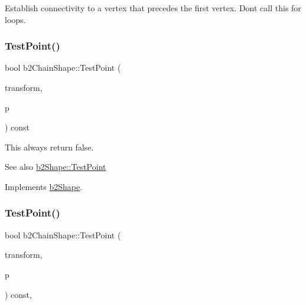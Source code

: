Establish connectivity to a vertex that precedes the first vertex. Don\textquotesingle{}t call this for loops. \mbox{\label{classb2ChainShape_a2d2d59b49c2611ad65ed68b0943d642d}} 
\subsubsection{\texorpdfstring{Test\+Point()}{TestPoint()}\hspace{0.1cm}{\footnotesize\ttfamily [1/2]}}
{\footnotesize\ttfamily bool b2\+Chain\+Shape\+::\+Test\+Point (\begin{DoxyParamCaption}\item[{const \hyperlink{structb2Transform}{b2\+Transform} \&}]{transform,  }\item[{const \hyperlink{structb2Vec2}{b2\+Vec2} \&}]{p }\end{DoxyParamCaption}) const\hspace{0.3cm}{\ttfamily [virtual]}}

This always return false. \begin{DoxySeeAlso}{See also}
\hyperlink{classb2Shape_a6ac968e403e2d93e8ae46d728a2e50fa}{b2\+Shape\+::\+Test\+Point} 
\end{DoxySeeAlso}


Implements \hyperlink{classb2Shape_a6ac968e403e2d93e8ae46d728a2e50fa}{b2\+Shape}.

\mbox{\label{classb2ChainShape_afd03c8679f18f9962a6c76bde629c62a}} 
\subsubsection{\texorpdfstring{Test\+Point()}{TestPoint()}\hspace{0.1cm}{\footnotesize\ttfamily [2/2]}}
{\footnotesize\ttfamily bool b2\+Chain\+Shape\+::\+Test\+Point (\begin{DoxyParamCaption}\item[{const \hyperlink{structb2Transform}{b2\+Transform} \&}]{transform,  }\item[{const \hyperlink{structb2Vec2}{b2\+Vec2} \&}]{p }\end{DoxyParamCaption}) const\hspace{0.3cm}{\ttfamily [override]}, {\ttfamily [virtual]}}

